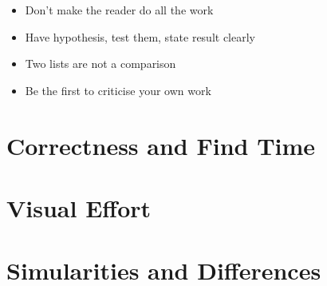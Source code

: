 \begin{itemize}
	\item Don’t make the reader do all the work
	\item Have hypothesis, test them, state result clearly
	\item Two lists are not a comparison
	\item Be the first to criticise your own work
\end{itemize}

\section{Correctness and Find Time}

\section{Visual Effort}

\section{Simularities and Differences}
